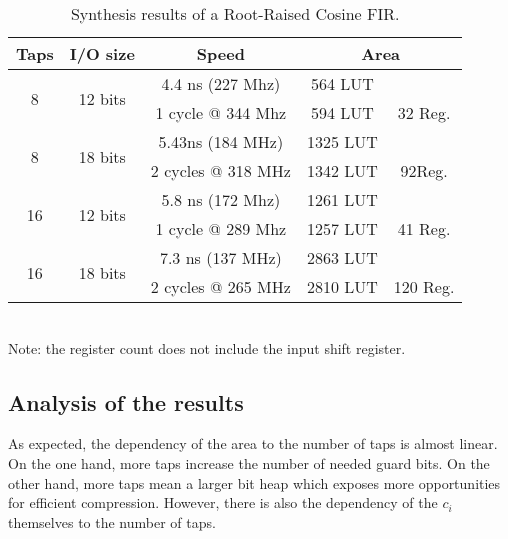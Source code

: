 \documentclass[twocolumn]{IEEEtran}
\begin{document}
\begin{table}
  \begin{center}
      \begin{tabular}{|c|c||c|cc|}
        \hline
        Taps		& I/O size &  Speed  		   	&      \multicolumn{2}{|c|}{Area} 	 \\
        \hline\hline
        \multirow{2}{*}{8} & \multirow{2}{*}{12 bits} &  4.4 ns (227 Mhz) & 564 LUT & \\
        &  &  1 cycle @ 344 Mhz & 594 LUT & 32 Reg.\\
        \hline
        \hline

        \multirow{2}{*}{8} & \multirow{2}{*}{18 bits} & 5.43ns (184 MHz) & 1325 LUT & \\
        &  & 2 cycles @ 318 MHz & 1342 LUT & 92Reg.\\
        \hline
        \hline

        \multirow{2}{*}{16} & \multirow{2}{*}{12 bits} &  5.8 ns (172 Mhz) & 1261 LUT & \\
        &  &  1 cycle @ 289 Mhz & 1257 LUT & 41 Reg.\\
        \hline
        \hline

        \multirow{2}{*}{16} & \multirow{2}{*}{18 bits} & 7.3 ns (137 MHz) & 2863 LUT &\\
        & &  2 cycles @ 265 MHz & 2810 LUT & 120 Reg.\\
        \hline
      \end{tabular}
      ~\\[0.5ex]
      Note: the register count does not include the input shift register. 
  \end{center}
  \caption{Synthesis results of a Root-Raised Cosine FIR.\label{tab:results:}}
\end{table}

\subsection{Analysis of the results}
As expected, the dependency of the area to the number of taps is almost linear. 
On the one hand, more taps increase the number of needed guard bits.
On the other hand, more taps mean a larger bit heap which exposes more opportunities for efficient compression. 
However, there is also the dependency of the $c_i$ themselves to the number of taps.
\end{document}
